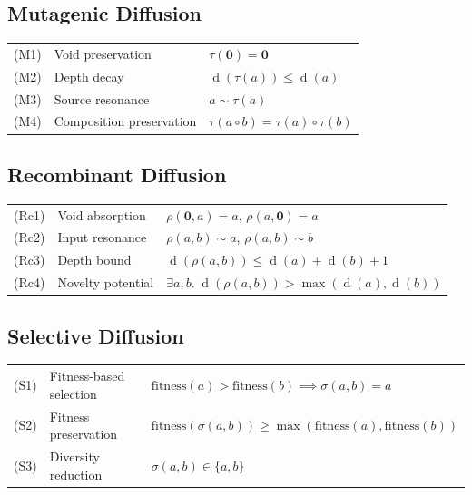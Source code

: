 \documentclass[11pt,openany]{book}
\theoremstyle{definition}
\theoremstyle{plain}
\theoremstyle{remark}
\newcommand{\compose}{\circ}                 %
\newcommand{\void}{\mathbf{0}}              %
\newcommand{\res}{\sim}                      %
\newcommand{\depth}{\operatorname{d}}       %
\newcommand{\transmit}{\tau}                 %
\begin{document}
\subsection{Mutagenic Diffusion}
\begin{center}
\begin{tabular}{lll}
(M1) & Void preservation & $\transmit(\void) = \void$ \\
(M2) & Depth decay & $\depth(\transmit(a)) \leq \depth(a)$ \\
(M3) & Source resonance & $a \res \transmit(a)$ \\
(M4) & Composition preservation & $\transmit(a \compose b) = \transmit(a) \compose \transmit(b)$ \\
\end{tabular}
\end{center}

\subsection{Recombinant Diffusion}
\begin{center}
\begin{tabular}{lll}
(Rc1) & Void absorption & $\rho(\void, a) = a$, $\rho(a, \void) = a$ \\
(Rc2) & Input resonance & $\rho(a, b) \res a$, $\rho(a, b) \res b$ \\
(Rc3) & Depth bound & $\depth(\rho(a, b)) \leq \depth(a) + \depth(b) + 1$ \\
(Rc4) & Novelty potential & $\exists a, b.\; \depth(\rho(a,b)) > \max(\depth(a), \depth(b))$ \\
\end{tabular}
\end{center}

\subsection{Selective Diffusion}
\begin{center}
\begin{tabular}{lll}
(S1) & Fitness-based selection & $\mathrm{fitness}(a) > \mathrm{fitness}(b) \implies \sigma(a, b) = a$ \\
(S2) & Fitness preservation & $\mathrm{fitness}(\sigma(a, b)) \geq \max(\mathrm{fitness}(a), \mathrm{fitness}(b))$ \\
(S3) & Diversity reduction & $\sigma(a, b) \in \{a, b\}$ \\
\end{tabular}
\end{center}
\end{document}
